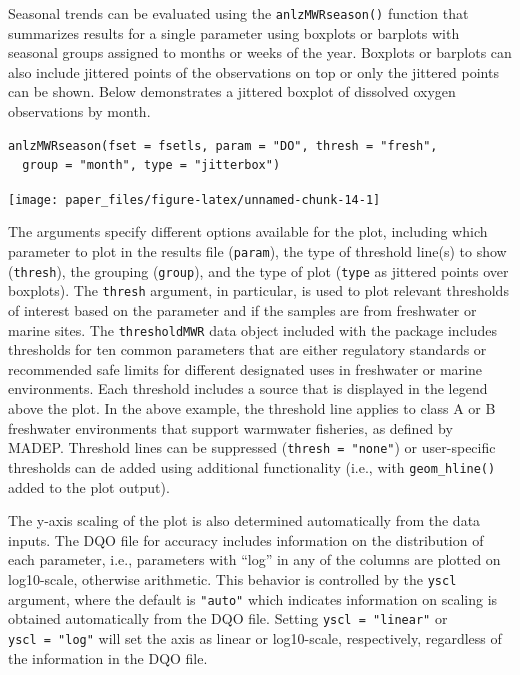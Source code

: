 Seasonal trends can be evaluated using the \texttt{anlzMWRseason()} function that summarizes results for a single parameter using boxplots or barplots with seasonal groups assigned to months or weeks of the year. Boxplots or barplots can also include jittered points of the observations on top or only the jittered points can be shown. Below demonstrates a jittered boxplot of dissolved oxygen observations by month.

\begin{verbatim}
anlzMWRseason(fset = fsetls, param = "DO", thresh = "fresh", 
  group = "month", type = "jitterbox")
\end{verbatim}

\begin{center}\texttt{[image: paper\_files/figure-latex/unnamed-chunk-14-1]} \end{center}

The arguments specify different options available for the plot, including which parameter to plot in the results file (\texttt{param}), the type of threshold line(s) to show (\texttt{thresh}), the grouping (\texttt{group}), and the type of plot (\texttt{type} as jittered points over boxplots). The \texttt{thresh} argument, in particular, is used to plot relevant thresholds of interest based on the parameter and if the samples are from freshwater or marine sites. The \texttt{thresholdMWR} data object included with the package includes thresholds for ten common parameters that are either regulatory standards or recommended safe limits for different designated uses in freshwater or marine environments. Each threshold includes a source that is displayed in the legend above the plot. In the above example, the threshold line applies to class A or B freshwater environments that support warmwater fisheries, as defined by MADEP. Threshold lines can be suppressed (\texttt{thresh\ =\ "none"}) or user-specific thresholds can de added using additional  functionality (i.e., with \texttt{geom\_hline()} added to the plot output).

The y-axis scaling of the plot is also determined automatically from the data inputs. The DQO file for accuracy includes information on the distribution of each parameter, i.e., parameters with ``log'' in any of the columns are plotted on log10-scale, otherwise arithmetic. This behavior is controlled by the \texttt{yscl} argument, where the default is \texttt{"auto"} which indicates information on scaling is obtained automatically from the DQO file. Setting \texttt{yscl\ =\ "linear"} or \texttt{yscl\ =\ "log"} will set the axis as linear or log10-scale, respectively, regardless of the information in the DQO file.

